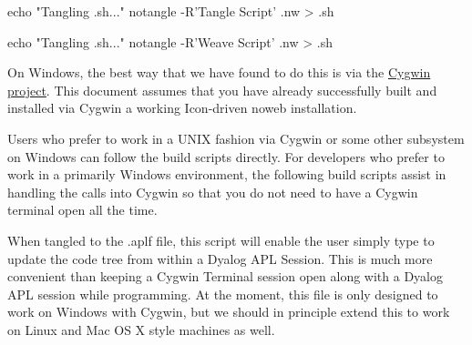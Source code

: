 \documentclass{article}%
\begin{document}
echo "Tangling .sh..."
notangle -R'Tangle Script' .nw > .sh

echo "Tangling .sh..."
notangle -R'Weave Script' .nw > .sh
\nwendcode{}\nwdocspar

On Windows, the best way that we have found to do this is
via the \href{https://www.cygwin.com/}{Cygwin project}.
This document assumes that you have already successfully built and
installed via Cygwin a working Icon-driven noweb installation.

Users who prefer to work in a UNIX fashion via Cygwin or some other
subsystem on Windows can follow the build scripts directly.
For developers who prefer to work in a primarily Windows environment,
the following build scripts assist in handling the calls into Cygwin
so that you do not need to have a Cygwin terminal open all the time.

When tangled to the {\Tt{}.aplf\nwendquote} file, this script will enable the
user simply type {\Tt{}\nwendquote} to update the code tree from within a
Dyalog APL Session.
This is much more convenient than keeping a Cygwin Terminal
session open along with a Dyalog APL session while programming.
At the moment, this file is only designed to work on Windows with
Cygwin, but we should in principle extend this to work on Linux
and Mac OS X style machines as well.
\end{document}

